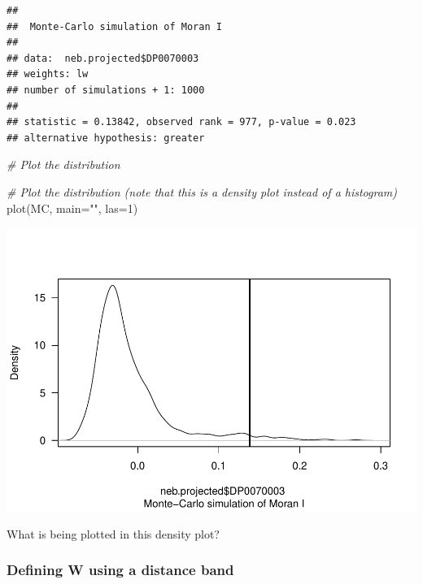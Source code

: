 \documentclass[]{article}
\newenvironment{Shaded}{\begin{snugshade}}{\end{snugshade}}
\newcommand{\AttributeTok}[1]{\textcolor[rgb]{0.77,0.63,0.00}{#1}}
\newcommand{\CommentTok}[1]{\textcolor[rgb]{0.56,0.35,0.01}{\textit{#1}}}
\newcommand{\DecValTok}[1]{\textcolor[rgb]{0.00,0.00,0.81}{#1}}
\newcommand{\FunctionTok}[1]{\textcolor[rgb]{0.00,0.00,0.00}{#1}}
\newcommand{\NormalTok}[1]{#1}
\newcommand{\OtherTok}[1]{\textcolor[rgb]{0.56,0.35,0.01}{#1}}
\newcommand{\SpecialCharTok}[1]{\textcolor[rgb]{0.00,0.00,0.00}{#1}}
\newcommand{\StringTok}[1]{\textcolor[rgb]{0.31,0.60,0.02}{#1}}
\begin{document}
\begin{Shaded}
\end{Shaded}

\begin{verbatim}
## 
##  Monte-Carlo simulation of Moran I
## 
## data:  neb.projected$DP0070003 
## weights: lw  
## number of simulations + 1: 1000 
## 
## statistic = 0.13842, observed rank = 977, p-value = 0.023
## alternative hypothesis: greater
\end{verbatim}

\begin{Shaded}
\begin{Highlighting}[]
\CommentTok{\# Plot the distribution}

\CommentTok{\# Plot the distribution (note that this is a density plot instead of a histogram)}
\FunctionTok{plot}\NormalTok{(MC, }\AttributeTok{main=}\StringTok{""}\NormalTok{, }\AttributeTok{las=}\DecValTok{1}\NormalTok{)}
\end{Highlighting}
\end{Shaded}

\includegraphics{lab03_files/figure-latex/moranmc-1.pdf}

What is being plotted in this density plot?

\hypertarget{defining-w-using-a-distance-band}{%
\subsubsection{\texorpdfstring{Defining \textbf{W} using a distance
band}{Defining W using a distance band}}\label{defining-w-using-a-distance-band}}
\end{document}
